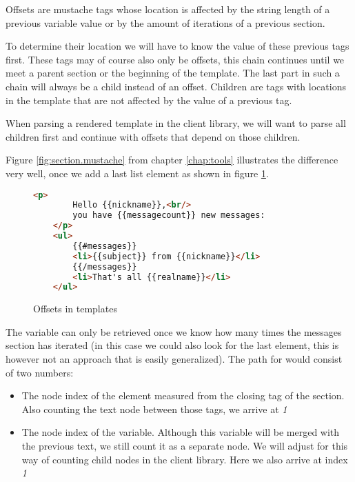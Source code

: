 Offsets are mustache tags whose location is affected by the string length of a
previous variable value or by the amount of iterations of a previous section.

To determine their location we will have to know the value of these previous
tags first. These tags may of course also only be offsets, this chain continues
until we meet a parent section or the beginning of the template.
The last part in such a chain will always be a child instead of an offset.
Children are tags with locations in the template that are not affected by
the value of a previous tag.

When parsing a rendered template in the client library, we will want to parse
all children first and continue with offsets that depend on those children.

Figure \ref{fig:section.mustache} from chapter \ref{chap:tools}
illustrates the difference very well, once we add a last list element as
shown in figure \ref{fig:offsets.mustache}.

\begin{figure}
	\centering
	\caption{Offsets in templates}
	\label{fig:offsets.mustache}
	\begin{lstlisting}[language=HTML]
	<p>
		Hello {{nickname}},<br/>
		you have {{messagecount}} new messages:
	</p>
	<ul>
		{{#messages}}
		<li>{{subject}} from {{nickname}}</li>
		{{/messages}}
		<li>That's all {{realname}}</li>
	</ul>
	\end{lstlisting}
\end{figure}

The  variable can only be retrieved once we know how
many times the messages section has iterated (in this case we could also look
for the last  element, this is however not an approach that is
easily generalized). The path for  would consist of
two numbers:
\begin{itemize}
\item The node index of the  element measured from
      the closing tag of the  section.
      Also counting the text node between those tags, we arrive at \emph{1}
\item The node index of the  variable. Although this
      variable will be merged with the previous text, we still count it as a
      separate node. We will adjust for this way of counting child nodes in
      the client library. Here we also arrive at index \emph{1}
\end{itemize}

